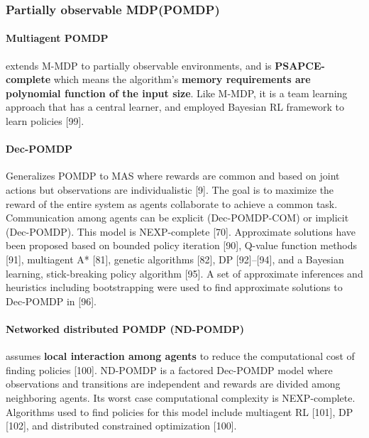 \documentclass{article}
\begin{document}
		   \subsubsection{Partially observable MDP(POMDP)}
			   \paragraph{Multiagent POMDP} extends M-MDP to partially observable environments, and is \textbf{PSAPCE-complete} which means the algorithm’s \textbf{memory requirements are polynomial function of the input size}. Like M-MDP, it is a team learning approach that has a central learner, and employed Bayesian RL framework to learn policies \citet{rizk-2018-decision-making-in-multiagent-systems-a-survey}[99].
			   
			   \paragraph{Dec-POMDP} Generalizes POMDP to MAS where rewards are common and based on joint actions but observations are individualistic \citet{rizk-2018-decision-making-in-multiagent-systems-a-survey}[9]. The goal is to maximize the reward of the entire system as agents collaborate to achieve a common task. Communication among agents can be explicit (Dec-POMDP-COM) or implicit (Dec-POMDP). This model is NEXP-complete \citet{rizk-2018-decision-making-in-multiagent-systems-a-survey}[70]. Approximate solutions have been proposed based on bounded policy iteration \citet{rizk-2018-decision-making-in-multiagent-systems-a-survey}[90], Q-value function methods [91], multiagent A* \citet{rizk-2018-decision-making-in-multiagent-systems-a-survey}[81], genetic algorithms \citet{rizk-2018-decision-making-in-multiagent-systems-a-survey}[82],
				DP \citet{rizk-2018-decision-making-in-multiagent-systems-a-survey}[92]–[94], and a Bayesian learning, stick-breaking policy algorithm \citet{rizk-2018-decision-making-in-multiagent-systems-a-survey}[95]. A set of approximate inferences and heuristics including bootstrapping were used to find approximate solutions to Dec-POMDP in \citet{rizk-2018-decision-making-in-multiagent-systems-a-survey}[96].
				
				\paragraph{Networked distributed POMDP (ND-POMDP)} assumes \textbf{local interaction among agents} to reduce the computational cost of finding policies \citet{rizk-2018-decision-making-in-multiagent-systems-a-survey}[100].  ND-POMDP is a factored Dec-POMDP model where observations and transitions are independent and rewards are divided among neighboring agents. Its worst case computational complexity is NEXP-complete. Algorithms used to find policies for this model include multiagent RL \citet{rizk-2018-decision-making-in-multiagent-systems-a-survey}[101], DP \citet{rizk-2018-decision-making-in-multiagent-systems-a-survey}[102], and distributed constrained optimization \citet{rizk-2018-decision-making-in-multiagent-systems-a-survey}[100].
				
\end{document}

